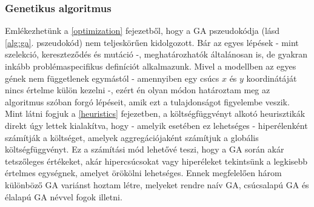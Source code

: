 


\subsubsection{Genetikus algoritmus}

Emlékezhetünk a \ref{optimization} fejezetből, hogy a GA pszeudokódja (lásd \ref{alg:ga}. pszeudokód) nem teljeskörűen kidolgozott. Bár az egyes lépések - mint szelekció, kereszteződés és mutáció -, meghatározhatók általánosan is, de gyakran inkább problémaspecifikus definíciót alkalmazunk. Mivel a modellben az egyes gének nem függetlenek egymástól - amennyiben egy csúcs $x$ és $y$ koordinátáját nincs értelme külön kezelni -, ezért én olyan módon határoztam meg az algoritmus szóban forgó lépéseit, amik ezt a tulajdonságot figyelembe veszik. Mint látni fogjuk a \ref{heuristics} fejezetben, a költségfüggvényt alkotó heurisztikák direkt úgy lettek kialakítva, hogy - amelyik esetében ez lehetséges - hiperélenként számítják a költséget, amelyek aggregációjaként számítjuk a globális költségfüggvényt. Ez a számítási mód lehetővé teszi, hogy a GA során akár tetszőleges értékeket, akár hipercsúcsokat vagy hiperéleket tekintsünk a legkisebb értelmes egységnek, amelyet örökölni lehetséges. Ennek megfelelően három különböző GA variánst hoztam létre, melyeket rendre naív GA, csúcsalapú GA és élalapú GA névvel fogok illetni.

